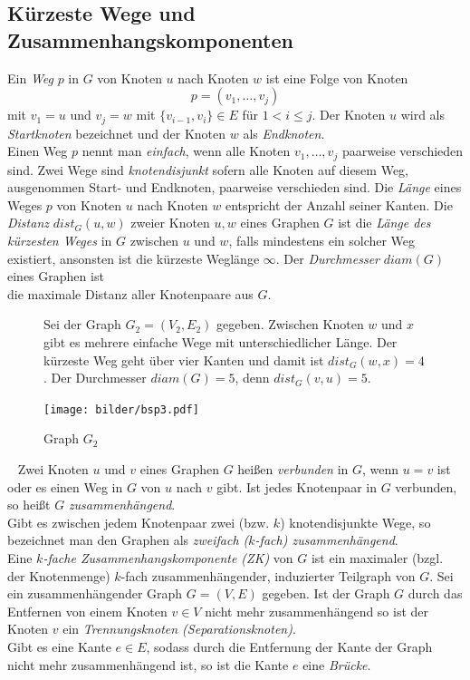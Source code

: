 \subsection{Kürzeste Wege und Zusammenhangskomponenten}
Ein \emph{Weg} $p$ in $G$ von Knoten $u$ nach Knoten $w$ ist eine Folge von Knoten $$p=(v_1,\ldots,v_j)$$ mit $v_1=u$ und $v_j=w$ mit $\{v_{i-1},v_i\}\in E$ für $1 <i \leq j$. Der Knoten $u$ wird als \emph{Startknoten} bezeichnet und der Knoten $w$ als \emph{Endknoten}.\\Einen Weg $p$ nennt man \emph{einfach}, wenn alle Knoten $v_1,\ldots,v_j$ paarweise verschieden sind. Zwei Wege sind \emph{knotendisjunkt} sofern alle Knoten auf diesem Weg, ausgenommen Start- und Endknoten, paarweise verschieden sind. Die \emph{Länge} eines Weges $p$ von Knoten $u$ nach Knoten $w$ entspricht der Anzahl seiner Kanten.\vspace{-1mm}\newline\newline
Die \emph{Distanz} $dist_G(u,w)$ zweier Knoten $u,w$ eines Graphen $G$ ist die \emph{Länge des kürzesten Weges} in $G$ zwischen $u$ und $w$, falls mindestens ein solcher Weg existiert, ansonsten ist die kürzeste Weglänge $\infty$. Der \emph{Durchmesser} $diam(G)$ eines Graphen ist\\die maximale Distanz aller Knotenpaare aus $G$.

\begin{figure}[h!]
\begin{minipage}{230pt}
Sei der Graph $G_2=(V_2,E_2)$ gegeben. Zwischen Knoten $w$ und $x$ gibt es mehrere einfache Wege mit unterschiedlicher Länge. Der kürzeste Weg geht über vier Kanten und damit ist $dist_G(w, x)=4$. Der Durchmesser $diam(G)=5$, denn $dist_G(v, u)=5$.
\end{minipage}
\begin{minipage}{220pt}
		\centering 		 
   \texttt{[image: bilder/bsp3.pdf]}
	\caption{Graph $G_2$}
\end{minipage}
  	 \end{figure}
  	 \vspace{-2mm}
  	 ~\linebreak
Zwei Knoten $u$ und $v$ eines Graphen $G$ heißen \emph{verbunden} in $G$, wenn $u = v$ ist oder es einen Weg in $G$ von $u$ nach $v$ gibt. Ist jedes Knotenpaar in $G$ verbunden, so heißt $G$ \emph{zusammenhängend}.\\Gibt es zwischen jedem Knotenpaar zwei (bzw. $k$) knotendisjunkte Wege, so bezeichnet man den Graphen als \emph{zweifach ($k$-fach) zusammenhängend}.\\Eine \emph{$k$-fache Zusammenhangskomponente (ZK)} von $G$ ist ein maximaler (bzgl. der Knotenmenge) $k$-fach zusammenhängender, induzierter Teilgraph von $G$.\newline\newline
Sei ein zusammenhängender Graph $G=(V,E)$ gegeben. Ist der Graph $G$ durch das Entfernen von einem Knoten $v \in V$ nicht mehr zusammenhängend so ist der Knoten $v$ ein \emph{Trennungsknoten (Separationsknoten)}.\\Gibt es eine Kante $e \in E$, sodass durch die Entfernung der Kante der Graph nicht mehr zusammenhängend ist, so ist die Kante $e$ eine \emph{Brücke}.

